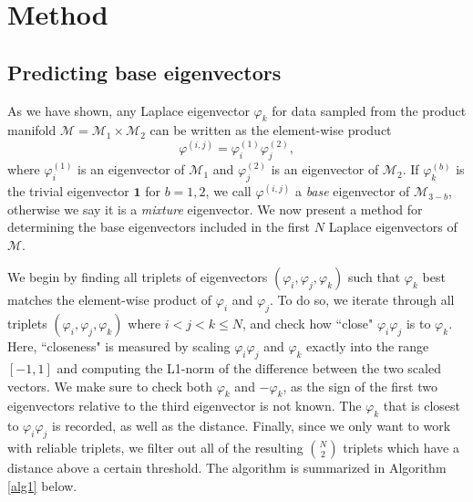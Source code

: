 \documentclass{article}
\numberwithin{equation}{section}
\theoremstyle{definition}
\begin{document}
\section{Method}
\subsection{Predicting base eigenvectors}
As we have shown, any Laplace eigenvector $\varphi_k$ for data sampled from the product manifold $\mathcal{M} = \mathcal{M}_1 \times \mathcal{M}_2$ can be written as the element-wise product
\begin{equation}
\varphi^{(i,j)} = \varphi^{(1)}_i \varphi^{(2)}_j,
\end{equation}
where $\varphi^{(1)}_i$ is an eigenvector of $\mathcal{M}_1$ and $\varphi^{(2)}_j$ is an eigenvector of $\mathcal{M}_2$. If $\varphi^{(b)}_k$ is the trivial eigenvector $\mathbf{1}$ for $b = 1,2$, we call $\varphi^{(i,j)}$ a \textit{base} eigenvector of $\mathcal{M}_{3-b}$, otherwise we say it is a \textit{mixture} eigenvector. We now present a method for determining the base eigenvectors included in the first $N$ Laplace eigenvectors of $\mathcal{M}$.

We begin by finding all triplets of eigenvectors $(\varphi_i, \varphi_j, \varphi_k)$ such that $\varphi_k$ best matches the element-wise product of $\varphi_i$ and $\varphi_j$. To do so, we iterate through all triplets $(\varphi_i, \varphi_j, \varphi_k)$ where $i < j < k \le N$, and check how ``close" $\varphi_i\varphi_j$ is to $\varphi_k$. Here, ``closeness" is measured by scaling $\varphi_i\varphi_j$ and $\varphi_k$ exactly into the range $[-1, 1]$ and computing the L1-norm of the difference between the two scaled vectors. We make sure to check both $\varphi_k$ and $-\varphi_k$, as the sign of the first two eigenvectors relative to the third eigenvector is not known. The $\varphi_k$ that is closest to $\varphi_i\varphi_j$ is recorded, as well as the distance. Finally, since we only want to work with reliable triplets, we filter out all of the resulting $\genfrac(){0pt}{2}{N}{2}$ triplets which have a distance above a certain threshold. The algorithm is summarized in Algorithm \ref{alg1} below. \\
\end{document}
